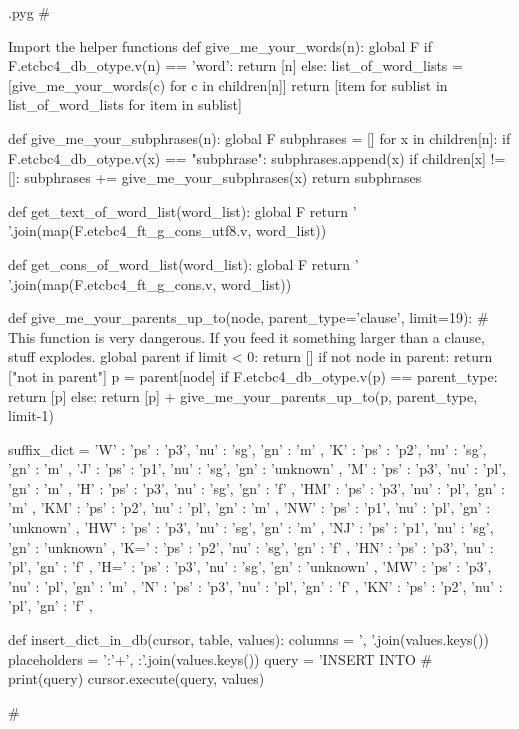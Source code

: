 \documentclass{report}
\makeatletter
\newenvironment{python}{%
  \VerbatimEnvironment
  \minted@resetoptions
  \setkeys{minted@opt}{}
      \begin{VerbatimOut}{\jobname.pyg}}
{%
      \end{VerbatimOut}
      \minted@pygmentize{python}
      \DeleteFile{\jobname.pyg}}
\makeatother
\begin{document}
\begin{python}
#{{{ Import the helper functions
def give_me_your_words(n):
        global F
        if F.etcbc4_db_otype.v(n) == 'word':
                return [n]
        else:
            list_of_word_lists = [give_me_your_words(c) for c in children[n]]
            return [item for sublist in list_of_word_lists for item in sublist]

def give_me_your_subphrases(n):
        global F
        subphrases = []
        for x in children[n]:
            if F.etcbc4_db_otype.v(x) == "subphrase":
                subphrases.append(x)
            if children[x] != []:
                subphrases += give_me_your_subphrases(x)
        return subphrases

def get_text_of_word_list(word_list):
        global F
        return ' '.join(map(F.etcbc4_ft_g_cons_utf8.v, word_list))

def get_cons_of_word_list(word_list):
        global F
        return ' '.join(map(F.etcbc4_ft_g_cons.v, word_list))

def give_me_your_parents_up_to(node, parent_type='clause', limit=19):
    # This function is very dangerous. If you feed it something larger than a clause, stuff explodes.
        global parent
        if limit < 0:
                return []
        if not node in parent:
                return ["not in parent"]
        p = parent[node]
        if F.etcbc4_db_otype.v(p) == parent_type:
                return [p]
        else:
                return [p] + give_me_your_parents_up_to(p, parent_type, limit-1)

suffix_dict = {
'W'   : { 'ps' : 'p3', 'nu' : 'sg', 'gn' : 'm' },
'K'   : { 'ps' : 'p2', 'nu' : 'sg', 'gn' : 'm' },
'J'   : { 'ps' : 'p1', 'nu' : 'sg', 'gn' : 'unknown' },
'M'   : { 'ps' : 'p3', 'nu' : 'pl', 'gn' : 'm' },
'H'   : { 'ps' : 'p3', 'nu' : 'sg', 'gn' : 'f' },
'HM'  : { 'ps' : 'p3', 'nu' : 'pl', 'gn' : 'm' },
'KM'  : { 'ps' : 'p2', 'nu' : 'pl', 'gn' : 'm' },
'NW'  : { 'ps' : 'p1', 'nu' : 'pl', 'gn' : 'unknown' },
'HW'  : { 'ps' : 'p3', 'nu' : 'sg', 'gn' : 'm' },
'NJ'  : { 'ps' : 'p1', 'nu' : 'sg', 'gn' : 'unknown' },
'K='  : { 'ps' : 'p2', 'nu' : 'sg', 'gn' : 'f' },
'HN'  : { 'ps' : 'p3', 'nu' : 'pl', 'gn' : 'f' },
'H='  : { 'ps' : 'p3', 'nu' : 'sg', 'gn' : 'unknown' },
'MW'  : { 'ps' : 'p3', 'nu' : 'pl', 'gn' : 'm' },
'N'   : { 'ps' : 'p3', 'nu' : 'pl', 'gn' : 'f' },
'KN'  : { 'ps' : 'p2', 'nu' : 'pl', 'gn' : 'f' },
}

def insert_dict_in_db(cursor, table, values):
        columns = ', '.join(values.keys())
        placeholders = ':'+', :'.join(values.keys())
        query = 'INSERT INTO %
#        print(query)
        cursor.execute(query, values)

#}}}
\end{python}
\end{document}
